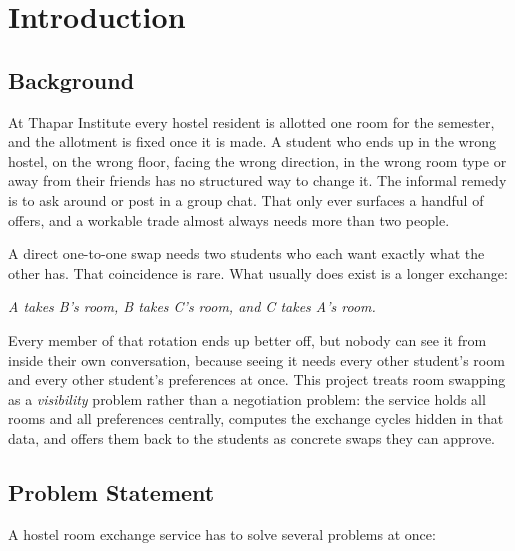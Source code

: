 
\chapter{Introduction}
\label{ch:introduction}

\section{Background}

At Thapar Institute every hostel resident is allotted one room for the
semester, and the allotment is fixed once it is made. A student who ends
up in the wrong hostel, on the wrong floor, facing the wrong direction,
in the wrong room type or away from their friends has no structured way
to change it. The informal remedy is to ask around or post in a group
chat. That only ever surfaces a handful of offers, and a workable trade
almost always needs more than two people.

A direct one-to-one swap needs two students who each want exactly what
the other has. That coincidence is rare. What usually does exist is a
longer exchange:

\begin{center}
\textit{A takes B's room, B takes C's room, and C takes A's room.}
\end{center}

Every member of that rotation ends up better off, but nobody can see it
from inside their own conversation, because seeing it needs every other
student's room and every other student's preferences at once. This
project treats room swapping as a \emph{visibility} problem rather than
a negotiation problem: the service holds all rooms and all preferences
centrally, computes the exchange cycles hidden in that data, and offers
them back to the students as concrete swaps they can approve.

\section{Problem Statement}

A hostel room exchange service has to solve several problems at once:

